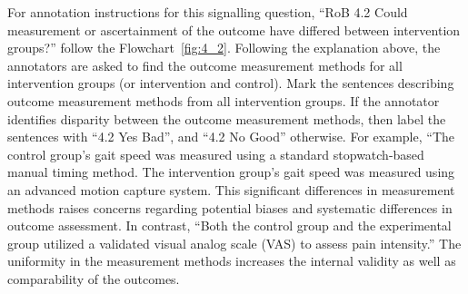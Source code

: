 \documentclass[sn-mathphys,Numbered]{sn-jnl}%
\begin{document}
For annotation instructions for this signalling question, ``RoB 4.2 Could measurement or ascertainment of the outcome have differed between intervention groups?'' follow the Flowchart~\ref{fig:4_2}.
Following the explanation above, the annotators are asked to find the outcome measurement methods for all intervention groups (or intervention and control).
Mark the sentences describing outcome measurement methods from all intervention groups.
If the annotator identifies disparity between the outcome measurement methods, then label the sentences with ``4.2 Yes Bad'', and ``4.2 No Good'' otherwise.
For example, ``The control group's gait speed was measured using a standard stopwatch-based manual timing method. The intervention group's gait speed was measured using an advanced motion capture system.
This significant differences in measurement methods raises concerns regarding potential biases and systematic differences in outcome assessment.
In contrast, ``Both the control group and the experimental group utilized a validated visual analog scale (VAS) to assess pain intensity.''
The uniformity in the measurement methods increases the internal validity as well as comparability of the outcomes.
%
%
%
\end{document}
